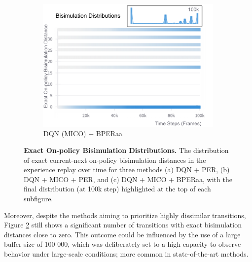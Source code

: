 \begin{figure}[H]
\begin{subfigure}{0.32\textwidth}
        \includegraphics[width=\linewidth]{Results/grid_world/exact_bisimulation_dqn_mico_bperaa.png}
        \caption{DQN (MICO) + BPERaa}
        \label{fig:exact_bisim_bperaa}
    \end{subfigure}
    \caption[Exact On-policy Bisimulation Distributions]{\textbf{Exact On-policy Bisimulation Distributions.} The distribution of exact current-next on-policy bisimulation distances in the experience replay over time for three methods (a) DQN + PER, (b) DQN + MICO + PER, and (c) DQN + MICO + BPERaa, with the final distribution (at 100k step) highlighted at the top of each subfigure.}
    \label{fig:exact_bisimulation_distributions}
\end{figure}


Moreover, despite the methods aiming to prioritize highly dissimilar transitions, Figure \ref{fig:exact_bisimulation_distributions} still shows a significant number of transitions with exact bisimulation distances close to zero. This outcome could be influenced by the use of a large buffer size of 100 000, which was deliberately set to a high capacity to observe behavior under large-scale conditions; more common in state-of-the-art methods.



